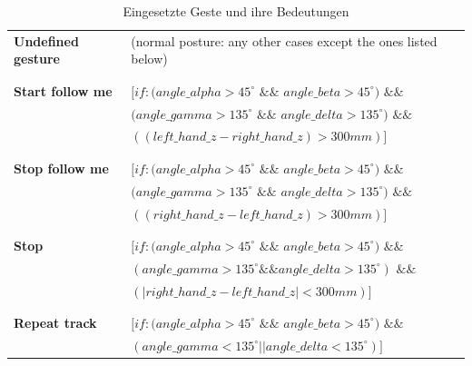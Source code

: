 \begin{table}[h]
\centering
\begin{tabular}{ll}
\textbf{Undefined gesture} & (normal posture: any other cases except the ones
 listed below)\\
 &\\
 &\\
\textbf{Start follow me} & $[if: (angle\_alpha > 45^\circ$ $\&\&$ $angle\_beta >
  45^\circ)$ $\&\&$\\
  & $(angle\_gamma > 135^\circ$ $\&\&$ $angle\_delta >
  135^\circ)$ $\&\&$\\
  & $((left\_hand\_z - right\_hand\_z) > 300 mm)]$\\
  &\\
  &\\
\textbf{Stop follow me} & $[if: (angle\_alpha > 45^\circ$ $\&\&$ $angle\_beta >
  45^\circ)$ $\&\&$\\
  & $(angle\_gamma > 135^\circ$ $\&\&$ $angle\_delta > 135^\circ)$ $\&\&$\\
  & $((right\_hand\_z - left\_hand\_z) > 300 mm)]$\\
  &\\
  &\\
\textbf{Stop} & $[if: (angle\_alpha > 45^\circ$ $\&\&$ $angle\_beta >
45^\circ)$ $\&\&$\\
 & $(angle\_gamma > 135^\circ \&\& angle\_delta > 135^\circ)$ $\&\&$\\
 & $(|right\_hand\_z - left\_hand\_z| < 300 mm)]$\\
 &\\
 &\\
\textbf{Repeat track} & $[if: (angle\_alpha > 45^\circ$ $\&\&$ $angle\_beta >
  45^\circ)$ $\&\&$\\
 & $(angle\_gamma < 135^\circ || angle\_delta < 135^\circ)]$
\end{tabular}
\caption{Eingesetzte Geste und ihre Bedeutungen}
\label{tab:Gesten}
\end{table}


